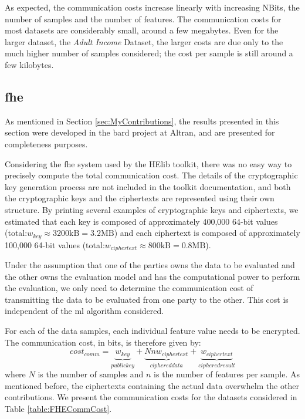 As expected, the communication costs increase linearly with increasing NBits, the number of samples and the number of features. The communication costs for most datasets are considerably small, around a few megabytes. Even for the larger dataset, the \emph{Adult Income} Dataset, the larger costs are due only to the much higher number of samples considered; the cost per sample is still around a few kilobytes.



\subsection{\acl{fhe}}
\label{ssec:comm_fhe}

As mentioned in Section \ref{sec:MyContributions}, the results presented in this section were developed in the \ac{bard} project at Altran, and are presented for completeness purposes.

Considering the \ac{fhe} system used by the HElib toolkit, there was no easy way to precisely compute the total communication cost. The details of the cryptographic key generation process are not included in the toolkit documentation, and both the cryptographic keys and the ciphertexts are represented using their own structure. By printing several examples of cryptographic keys and ciphertexts, we estimated that each key is composed of approximately 400,000 64-bit values (total:$w_{key}\approx 3200\text{kB}=3.2\text{MB}$) and each ciphertext is composed of approximately 100,000 64-bit values (total:$w_{ciphertext}\approx 800\text{kB}=0.8\text{MB}$).

Under the assumption that one of the parties owns the data to be evaluated and the other owns the evaluation model and has the computational power to perform the evaluation, we only need to determine the communication cost of transmitting the data to be evaluated from one party to the other. This cost is independent of the \ac{ml} algorithm considered.

For each of the data samples, each individual feature value needs to be encrypted. The communication cost, in bits, is therefore given by:
\begin{equation}
\label{eq:FHE_commCost}
cost_{comm} = \underbrace{w_{key}}_{public key} + \underbrace{Nnw_{ciphertext}}_{ciphered data} + \underbrace{w_{ciphertext}}_{ciphered result}
\end{equation}
where $N$ is the number of samples and $n$ is the number of features per sample. As mentioned before, the ciphertexts containing the actual data overwhelm the other contributions. We present the communication costs for the datasets considered in Table \ref{table:FHECommCost}.


